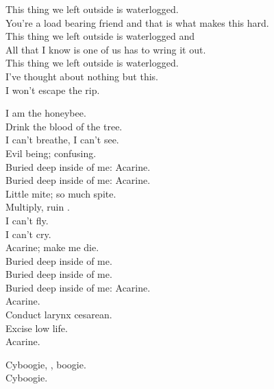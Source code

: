This thing we left outside is waterlogged. \\
You're a load bearing friend and that is what makes this hard. \\
This thing we left outside is waterlogged and \\
All that I know is one of us has to wring it out. \\
This thing we left outside is waterlogged. \\
I've thought about nothing but this. \\
I won't escape the rip. \\




I am the honeybee. \\
Drink the blood of the tree. \\
I can't breathe, I can't see. \\
Evil being; confusing. \\

Buried deep inside of me: Acarine. \\
Buried deep inside of me: Acarine. \\

Little mite; so much spite. \\
Multiply, ruin . \\
I can't fly. \\
I can't cry. \\
Acarine; make me die. \\

Buried deep inside of me. \\
Buried deep inside of me. \\
Buried deep inside of me: Acarine. \\

Acarine. \\
Conduct larynx cesarean. \\
Excise low life. \\
Acarine. \\




Cyboogie, , boogie. \\
Cyboogie. \\

